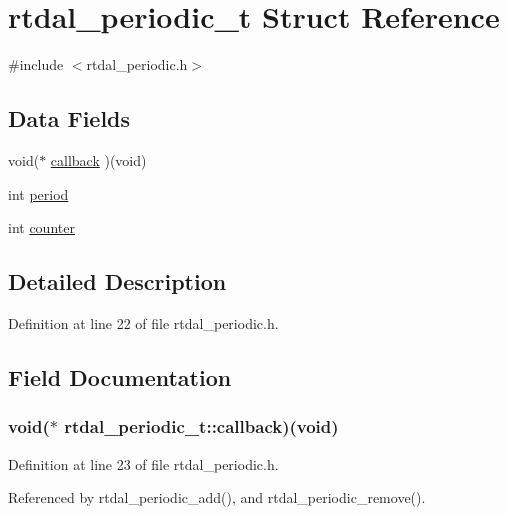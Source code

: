 \hypertarget{structrtdal__periodic__t}{\section{rtdal\-\_\-periodic\-\_\-t Struct Reference}
\label{structrtdal__periodic__t}
}


{\ttfamily \#include $<$rtdal\-\_\-periodic.\-h$>$}

\subsection*{Data Fields}
\begin{DoxyCompactItemize}
\item 
void($\ast$ \hyperlink{structrtdal__periodic__t_a34f3cfcdf838e3d06f9e4dbdc3875156}{callback} )(void)
\item 
int \hyperlink{structrtdal__periodic__t_afe8337bd8b7d4b0abc130f9dfb723bf2}{period}
\item 
int \hyperlink{structrtdal__periodic__t_aab5ee7319833ace02d2d350cc3af9d28}{counter}
\end{DoxyCompactItemize}


\subsection{Detailed Description}


Definition at line 22 of file rtdal\-\_\-periodic.\-h.



\subsection{Field Documentation}
\hypertarget{structrtdal__periodic__t_a34f3cfcdf838e3d06f9e4dbdc3875156}{
\subsubsection[{callback}]{\setlength{\rightskip}{0pt plus 5cm}void($\ast$ rtdal\-\_\-periodic\-\_\-t\-::callback)(void)}}\label{structrtdal__periodic__t_a34f3cfcdf838e3d06f9e4dbdc3875156}


Definition at line 23 of file rtdal\-\_\-periodic.\-h.



Referenced by rtdal\-\_\-periodic\-\_\-add(), and rtdal\-\_\-periodic\-\_\-remove().

